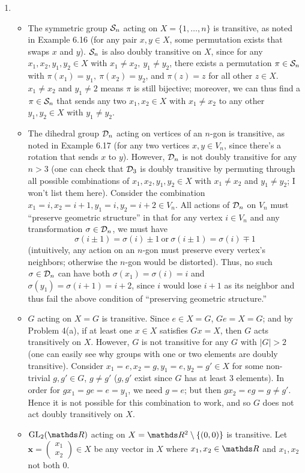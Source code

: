 \documentclass{homework}
\begin{document}
\begin{solution}
\begin{enumerate}[label=(\alph*)]
    \item
      \begin{itemize}
        \item The symmetric group $\mathcal{S}_n$ acting on $X=\{ 1,\ldots,n \}$ is transitive, as noted in
          Example 6.16 (for any pair $x,y\in X$, some permutation exists that swaps $x$ and $y$).
          $\mathcal{S}_n$ is also doubly transitive on $X$, since for any $x_1,x_2,y_1,y_2\in X$ with
          $x_1\neq x_2,\ y_1\neq y_2$, there exists a permutation $\pi\in \mathcal{S}_n$ with
          $\pi(x_1)=y_1,\ \pi(x_2)=y_2$, and $\pi(z)=z$ for all other $z\in X$. $x_1\neq x_2$ and
          $y_1\neq 2$ means $\pi$ is still bijective; moreover, we can thus find a $\pi\in \mathcal{S}_n$
          that sends any two $x_1,x_2\in X$ with $x_1\neq x_2$ to any other $y_1,y_2\in X$ with
          $y_1\neq y_2$.
        \item The dihedral group $\mathcal{D}_n$ acting on vertices of an $n$-gon is transitive, as noted in
          Example 6.17 (for any two vertices $x,y\in V_n$, since there's a rotation that sends $x$
          to $y$). However, $\mathcal{D}_n$ is not doubly transitive for any $n>3$ (one can check that $\mathcal{D}_3$
          is doubly transitive by permuting through all possible combinations of $x_1,x_2,y_1,y_2\in
          X$ with $x_1\neq x_2$ and $y_1\neq y_2$; I won't list them here). Consider the combination
          $x_1=i, x_2=i+1,y_1=i,y_2=i+2\in V_n$. All actions of $\mathcal{D}_n$ on $V_n$ must ``preserve
          geometric structure'' in that for any vertex $i\in V_n$ and any transformation $\sigma\in
          \mathcal{D}_n$, we must have \[
            \sigma(i\pm 1)=\sigma(i)\pm 1~\text{or}~\sigma(i\pm 1)=\sigma(i)\mp 1
          \] (intuitively, any action on an $n$-gon must preserve every vertex's neighbors;
          otherwise the $n$-gon would be distorted). Thus, no such $\sigma\in \mathcal{D}_n$ can have both
          $\sigma(x_1)=\sigma(i)=i$ and $\sigma(y_1)=\sigma(i+1)=i+2$, since $i$ would lose $i+1$ as
          its neighbor and thus fail the above condition of ``preserving geometric structure.''
        \item $G$ acting on $X=G$ is transitive. Since $e\in X=G$, $Ge=X=G$; and by Problem 4(a), if
          at least one $x\in X$ satisfies $Gx=X$, then $G$ acts transitively on $X$. However, $G$ is
          not transitive for any $G$ with $\left| G \right| >2$ (one can easily see why groups with
          one or two elements are doubly transitive). Consider $x_1=e,x_2=g,y_1=e,y_2=g'\in X$ for
          some non-trivial $g,g'\in G$, $g\neq g'$ ($g,g'$ exist since $G$ has at least $3$
          elements). In order for $gx_1=ge=e=y_1$, we need $g=e$; but then $gx_2=eg=g\neq g'$. Hence
          it is not possible for this combination to work, and so $G$ does not act doubly
          transitively on $X$.
        \item $\GL_{2}(\R)$ acting on $X=\R^2\setminus \{ (0,0) \}$ is transitive. Let
          $\textbf{x}=\begin{pmatrix} x_1\\x_2 \end{pmatrix}\in X $ be any vector in $X$ where
          $x_1,x_2\in \R$ and $x_1,x_2$ not both $0$. 


\end{itemize}
\end{enumerate}
\end{solution}
\end{document}
